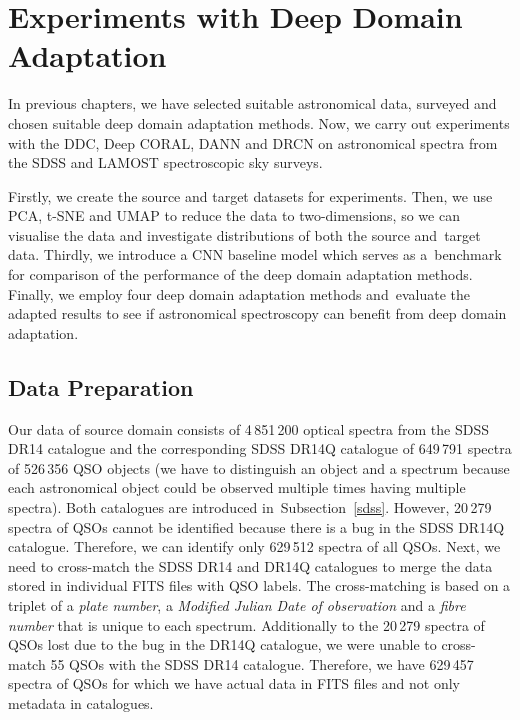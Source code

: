 \chapter{Experiments with Deep Domain Adaptation}
\label{exp_chapter}

In previous chapters, we have selected suitable astronomical data, surveyed and chosen suitable deep domain adaptation methods. Now, we carry out experiments with the DDC, Deep CORAL, DANN and DRCN on astronomical spectra from the SDSS and LAMOST spectroscopic sky surveys.

Firstly, we create the source and target datasets for experiments. Then, we use PCA, t-SNE and UMAP to reduce the data to two-dimensions, so we can visualise the data and investigate distributions of both the source and~target data. Thirdly, we introduce a CNN baseline model which serves as a~benchmark for comparison of the performance of the deep domain adaptation methods. Finally, we employ four deep domain adaptation methods and~evaluate the adapted results to see if astronomical spectroscopy can benefit from deep domain adaptation.

\section{Data Preparation}
\label{data_preparation}

Our data of source domain consists of 4\,851\,200 optical spectra from the SDSS DR14 catalogue
and the corresponding SDSS DR14Q catalogue of 649\,791 spectra of 526\,356 QSO objects
(we have to distinguish an object and a spectrum
because each astronomical object could be observed multiple times having multiple spectra).
Both catalogues are introduced in~Subsection~\ref{sdss}.
However, 20\,279 spectra of QSOs cannot be identified
because there is a bug in the SDSS DR14Q catalogue.
Therefore, we can identify only 629\,512 spectra of all QSOs.
Next, we need to cross-match the SDSS DR14 and DR14Q catalogues
to merge the data stored in individual FITS files with QSO labels.
The cross-matching is based on a triplet of a \textit{plate number}, a \textit{Modified Julian Date of observation} and a \textit{fibre number}
that is unique to each spectrum.
Additionally to the 20\,279 spectra of QSOs lost due to the bug in the DR14Q catalogue,
we were unable to cross-match 55 QSOs with the SDSS DR14 catalogue.
Therefore, we have 629\,457 spectra of QSOs
for which we have actual data in FITS files and not only metadata in catalogues.

